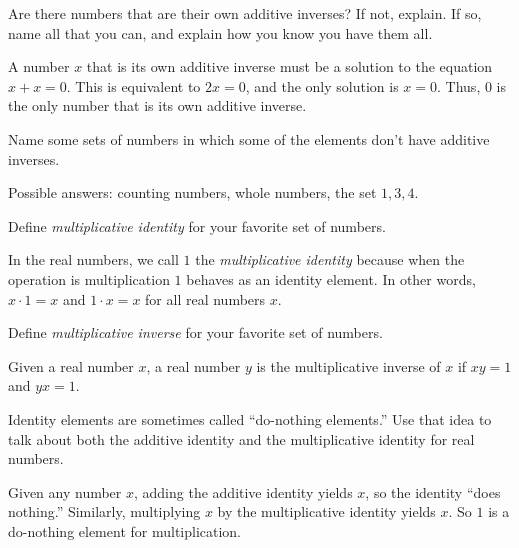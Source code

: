 \documentclass{ximera}
\begin{document}
\begin{question}
Are there numbers that are their own additive inverses?  If not,
explain.  If so, name all that you can, and explain how you know you
have them all.
\begin{freeResponse}
A number $x$ that is its own additive inverse must be a solution to
the equation $x+x = 0$.  This is equivalent to $2x=0$, and the only
solution is $x=0$.  Thus, 0 is the only number that is its own
additive inverse.
\end{freeResponse}
\end{question}

\begin{question}
Name some sets of numbers in which some of the elements don't have
additive inverses.
\begin{freeResponse}
Possible answers: counting numbers, whole numbers, the set ${1, 3,
  4}$.
\end{freeResponse}
\end{question}

\begin{question}Define \emph{multiplicative identity} for your favorite set of numbers.  
\begin{freeResponse}
In the real numbers, we call $1$ the \emph{multiplicative identity} because when the operation is multiplication 
$1$ behaves as an identity element.  
In other words, $x\cdot 1=x$ and $1\cdot x=x$ for all real numbers $x$.  
\end{freeResponse}
\end{question}

\begin{question}Define \emph{multiplicative inverse} for your favorite set of numbers.  
\begin{freeResponse}
Given a real number $x$, a real number $y$ is the multiplicative inverse of $x$ if $xy=1$ and $yx=1$.  
\end{freeResponse}
\end{question}

\begin{question}Identity elements are sometimes called ``do-nothing elements.''  Use that idea to talk about both the additive identity and the multiplicative identity for real numbers.  
\begin{freeResponse}
Given any number $x$, adding the additive identity yields $x$, so the identity ``does nothing.''  Similarly, multiplying $x$ by the multiplicative identity yields $x$.  So $1$ is a do-nothing element for multiplication.  
\end{freeResponse}
\end{question}
\end{document}
